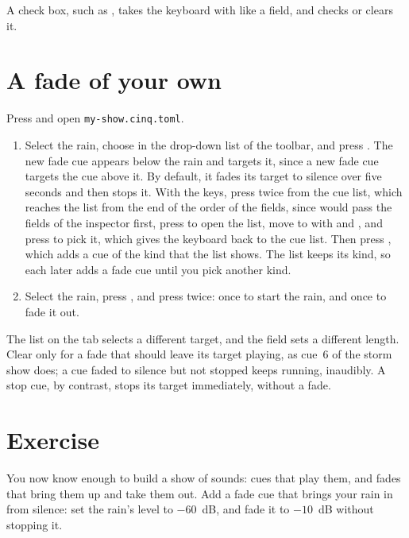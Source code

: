 A check box, such as , takes the keyboard with
 like a field, and  checks or clears it.

\section{A fade of your own}

Press  and open \texttt{my-show.cinq.toml}.

\begin{enumerate}
\item Select the rain, choose  in the  drop-down list of
  the toolbar, and press .  The new fade cue appears below the
  rain and targets it, since a new fade cue targets the cue above it.  By
  default, it fades its target to silence over five seconds and then stops
  it.  With the keys, press  twice from the cue list, which
  reaches the  list from the end of the order of the fields,
  since  would pass the fields of the inspector first, press
   to open the list, move to  with  and ,
  and press  to pick it, which gives the keyboard back to the cue
  list.  Then press , which adds a cue of the kind that the list shows.
  The list keeps its kind, so each later  adds a fade cue until you
  pick another kind.
\item Select the rain, press , and press  twice:
  once to start the rain, and once to fade it out.
\end{enumerate}

The  list on the  tab selects a different target, and
the  field sets a different length.  Clear  only for a fade that should leave its target playing, as cue~6 of the
storm show does; a cue faded to silence but not stopped keeps running,
inaudibly.  A stop cue, by contrast, stops its target immediately, without a
fade.

\section*{Exercise}

You now know enough to build a show of sounds: cues that play them, and fades
that bring them up and take them out.  Add a fade cue that brings your rain
in from silence: set the rain's level to $-60$~dB, and fade it to $-10$~dB
without stopping it.
